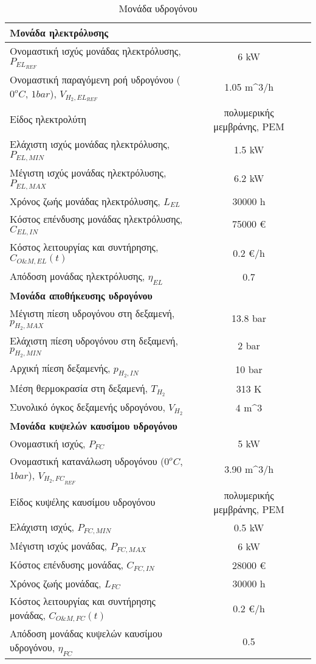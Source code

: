 \begin{table}[htbp]
    \centering
    \caption{Μονάδα υδρογόνου}
    \label{tab:hyd_data}
    \begin{tabular}{lcr}
    \hline
    \textbf{Μονάδα ηλεκτρόλυσης} \\
    \hline
    Ονομαστική ισχύς μονάδας ηλεκτρόλυσης, $P_{{EL}_{REF}}$ & 6 kW \\
    Ονομαστική παραγόμενη ροή υδρογόνου ($0^oC$, $1 bar$), $V_{H_2,EL_{REF}}$ & 1.05 m^3/h \\
    Είδος ηλεκτρολύτη & πολυμερικής μεμβράνης, PEM \\
    Ελάχιστη ισχύς μονάδας ηλεκτρόλυσης, $P_{EL,MIN}$ & 1.5 kW \\
    Μέγιστη ισχύς μονάδας ηλεκτρόλυσης, $P_{EL,MAX}$ & 6.2 kW \\
    Χρόνος ζωής μονάδας ηλεκτρόλυσης, $L_{EL}$ & 30000 h \\
    Κόστος επένδυσης μονάδας ηλεκτρόλυσης, $C_{EL,IN}$ & 75000 € \\
    Κόστος λειτουργίας και συντήρησης, $C_{O\&M,EL}(t)$ & 0.2 €/h \\
    Απόδοση μονάδας ηλεκτρόλυσης, $\eta_{EL}$ & 0.7 \\
    \hline
    \textbf{Μονάδα αποθήκευσης υδρογόνου} \\
    \hline
    Μέγιστη πίεση υδρογόνου στη δεξαμενή, $p_{H_2,MAX}$ & 13.8 bar \\
    Ελάχιστη πίεση υδρογόνου στη δεξαμενή, $p_{H_2,MIN}$ & 2 bar \\
    Αρχική πίεση δεξαμενής, $p_{H_2,IN}$ & 10 bar \\
    Μέση θερμοκρασία στη δεξαμενή, $T_{H_2}$ & 313 K \\
    Συνολικό όγκος δεξαμενής υδρογόνου, $V_{H_2}$ & 4 m^3 \\
    \hline
    \textbf{Μονάδα κυψελών καυσίμου υδρογόνου} \\
    \hline
    Ονομαστική ισχύς, $P_{FC}$ & 5 kW \\
    Ονομαστική κατανάλωση υδρογόνου ($0^oC$, $1 bar$), $V_{{H_2,FC}_{REF}}$ & 3.90 m^3/h \\
    Είδος κυψέλης καυσίμου υδρογόνου & πολυμερικής μεμβράνης, PEM  \\
    Ελάχιστη ισχύς, $P_{FC,MIN}$ & 0.5 kW \\
    Μέγιστη ισχύς μονάδας, $P_{FC,MAX}$ & 6 kW \\
    Κόστος επένδυσης μονάδας, $C_{FC,IN}$ & 28000 € \\
    Χρόνος ζωής μονάδας, $L_{FC}$ & 30000 h \\
    Κόστος λειτουργίας και συντήρησης μονάδας, $C_{O\&M,FC}(t)$ & 0.2 €/h \\
    Απόδοση μονάδας κυψελών καυσίμου υδρογόνου, $\eta_{FC}$ & 0.5 \\
    \hline 
    \end{tabular}
\end{table}   